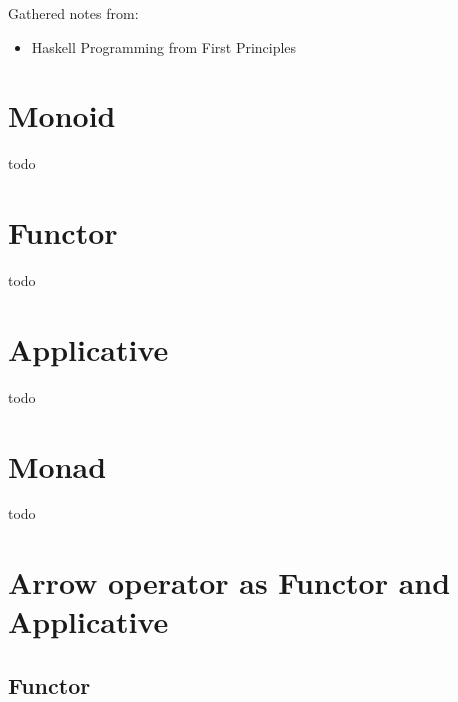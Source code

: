 \documentclass[8pt]{extarticle}
\begin{document}

  
\begin{multicols*}{2}

  Gathered notes from:
  \begin{itemize}
  \item Haskell Programming from First Principles \cite{hpffp}
  \end{itemize}

  \section{Monoid}
  todo

  \vfill\null
  \columnbreak

  \section{Functor}
  todo

  \vfill\null
  \columnbreak

  \section{Applicative}
  todo

  \vfill\null
  \columnbreak

  \section{Monad}
  todo

  \vfill\null
  \columnbreak
    
  \section{Arrow operator as Functor and Applicative}

  \subsection{Functor}


\end{multicols*}
\end{document}
